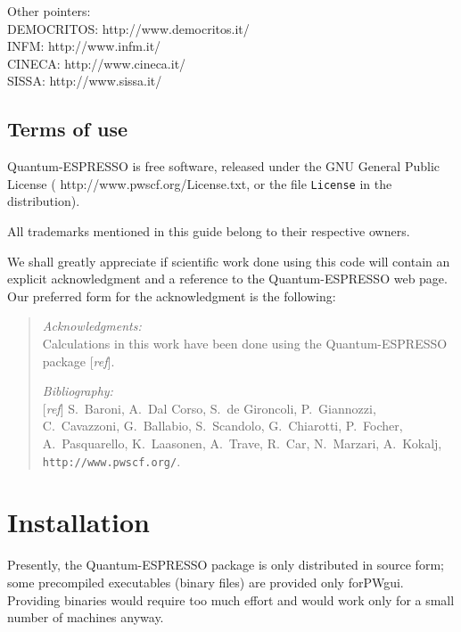 \documentclass[12pt,a4paper]{article}
\begin{document}
Other pointers:\\
DEMOCRITOS:
%
                  {http://www.democritos.it/}\\
INFM:
%
                  {http://www.infm.it/}\\
CINECA:
%
                  {http://www.cineca.it/}\\
SISSA:
%
                  {http://www.sissa.it/}

\subsection{Terms of use}

Quantum-ESPRESSO is free software, released under the GNU General Public
License
(%
                   {http://www.pwscf.org/License.txt},
or the file \texttt{License} in the distribution).

All trademarks mentioned in this guide belong to their respective
owners.

We shall greatly appreciate if scientific work done using this code
will contain an explicit acknowledgment and a reference to the
Quantum-ESPRESSO web page.
Our preferred form for the acknowledgment is the following:

\begin{quote}
\emph{Acknowledgments:}\\
Calculations in this work have been done using the Quantum-ESPRESSO package
[\emph{ref}].
\par\noindent
\emph{Bibliography:}\\{}
[\emph{ref}]
S.~Baroni, A.~Dal Corso, S.~de Gironcoli, P.~Giannozzi, %
C.~Cavazzoni, G.~Ballabio, S.~Scandolo, G.~Chiarotti, P.~Focher, %
A.~Pasquarello, K.~Laasonen, A.~Trave, R.~Car, N.~Marzari, %
A.~Kokalj, %
\texttt{http://www.pwscf.org/}.
\end{quote}

\clearpage

\section{Installation}
  \label{installation}

Presently, the Quantum-ESPRESSO package is only distributed in source
form; some precompiled executables (binary files) are provided only
for\break PWgui. Providing binaries would require too much effort
and would work only for a small number of machines anyway.
\end{document}
